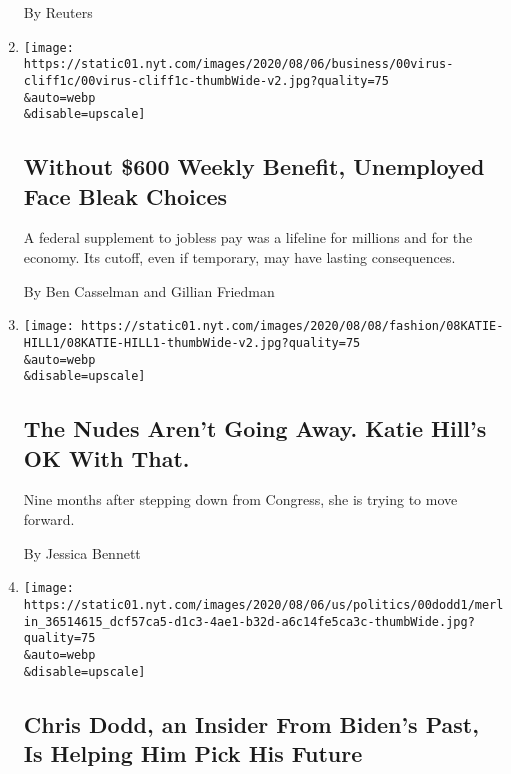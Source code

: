 \begin{enumerate}
  By Reuters
\item
  \href{/2020/08/08/business/economy/lost-unemployment-benefits.html}{}

  \texttt{[image: https://static01.nyt.com/images/2020/08/06/business/00virus-cliff1c/00virus-cliff1c-thumbWide-v2.jpg?quality=75\\\&auto=webp\\\&disable=upscale]}

  \hypertarget{without-600-weekly-benefit-unemployed-face-bleak-choices}{%
  \subsection{Without \$600 Weekly Benefit, Unemployed Face Bleak
  Choices}\label{without-600-weekly-benefit-unemployed-face-bleak-choices}}

  A federal supplement to jobless pay was a lifeline for millions and
  for the economy. Its cutoff, even if temporary, may have lasting
  consequences.

  By Ben Casselman and Gillian Friedman
\item
  \href{/2020/08/08/style/katie-hill-she-will-rise-revenge-porn.html}{}

  \texttt{[image: https://static01.nyt.com/images/2020/08/08/fashion/08KATIE-HILL1/08KATIE-HILL1-thumbWide-v2.jpg?quality=75\\\&auto=webp\\\&disable=upscale]}

  \hypertarget{the-nudes-arent-going-away-katie-hills-ok-with-that}{%
  \subsection{The Nudes Aren't Going Away. Katie Hill's OK With
  That.}\label{the-nudes-arent-going-away-katie-hills-ok-with-that}}

  Nine months after stepping down from Congress, she is trying to move
  forward.

  By Jessica Bennett
\item
  \href{/2020/08/08/us/politics/biden-vp-chris-dodd.html}{}

  \texttt{[image: https://static01.nyt.com/images/2020/08/06/us/politics/00dodd1/merlin\_36514615\_dcf57ca5-d1c3-4ae1-b32d-a6c14fe5ca3c-thumbWide.jpg?quality=75\\\&auto=webp\\\&disable=upscale]}

  \hypertarget{chris-dodd-an-insider-from-bidens-past-is-helping-him-pick-his-future}{%
  \subsection{Chris Dodd, an Insider From Biden's Past, Is Helping Him
  Pick His
  Future}\label{chris-dodd-an-insider-from-bidens-past-is-helping-him-pick-his-future}}


\end{enumerate}
